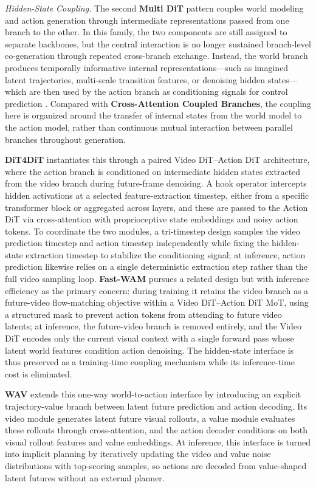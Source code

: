 \textcolor{openmossblue}{\textit{Hidden-State Coupling.}}
The second \textbf{Multi DiT} pattern couples world modeling and action generation through intermediate representations passed from one branch to the other. In this family, the two components are still assigned to separate backbones, but the central interaction is no longer sustained branch-level co-generation through repeated cross-branch exchange. Instead, the world branch produces temporally informative internal representations—such as imagined latent trajectories, multi-scale transition features, or denoising hidden states—which are then used by the action branch as conditioning signals for control prediction \cite{Act2Goal,DiT4DiT}. Compared with \textbf{Cross-Attention Coupled Branches}, the coupling here is organized around the transfer of internal states from the world model to the action model, rather than continuous mutual interaction between parallel branches throughout generation. 

\textbf{DiT4DiT }\cite{DiT4DiT} instantiates this through a paired Video DiT–Action DiT architecture, where the action branch is conditioned on intermediate hidden states extracted from the video branch during future-frame denoising. A hook operator intercepts hidden activations at a selected feature-extraction timestep, either from a specific transformer block or aggregated across layers, and these are passed to the Action DiT via cross-attention with proprioceptive state embeddings and noisy action tokens. To coordinate the two modules, a tri-timestep design samples the video prediction timestep and action timestep independently while fixing the hidden-state extraction timestep to stabilize the conditioning signal; at inference, action prediction likewise relies on a single deterministic extraction step rather than the full video sampling loop. \textbf{Fast-WAM} \cite{FastWAM} pursues a related design but with inference efficiency as the primary concern: during training it retains the video branch as a future-video flow-matching objective within a Video DiT–Action DiT MoT, using a structured mask to prevent action tokens from attending to future video latents; at inference, the future-video branch is removed entirely, and the Video DiT encodes only the current visual context with a single forward pass whose latent world features condition action denoising. The hidden-state interface is thus preserved as a training-time coupling mechanism while its inference-time cost is eliminated.

\textbf{WAV} \cite{WAV} extends this one-way world-to-action interface by introducing an explicit trajectory-value branch between latent future prediction and action decoding. Its video module generates latent future visual rollouts, a value module evaluates these rollouts through cross-attention, and the action decoder conditions on both visual rollout features and value embeddings. At inference, this interface is turned into implicit planning by iteratively updating the video and value noise distributions with top-scoring samples, so actions are decoded from value-shaped latent futures without an external planner.

